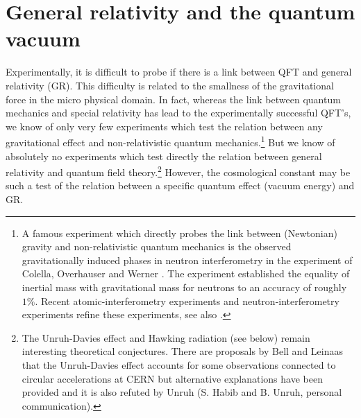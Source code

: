 \documentclass[12pt]{article}
\def\s{\section}
\begin{document}
\s{General relativity and the quantum vacuum}


Experimentally, it is difficult to probe if there is a link
between QFT and general relativity (GR). This difficulty is
related to the smallness of the gravitational force in the micro
physical domain. In fact, whereas the link between quantum
mechanics and special relativity has lead to the experimentally
successful QFT's, we know of only very few experiments which test
the relation between any gravitational effect and non-relativistic
quantum mechanics.\footnote{A famous experiment which directly
probes the link between (Newtonian) gravity and non-relativistic
quantum mechanics is the observed gravitationally induced phases
in neutron interferometry in the experiment of Colella, Overhauser
and Werner \cite{colella75}. The experiment established the
equality of inertial mass with gravitational mass for neutrons to
an accuracy of roughly $1 \%$. Recent atomic-interferometry
experiments and neutron-interferometry experiments refine these
experiments, see also \cite{adunas00}.} But we know of absolutely
no experiments which test directly the relation between general
relativity and quantum field theory.\footnote{The Unruh-Davies
effect and Hawking radiation (see below) remain interesting theoretical
conjectures. There are proposals by Bell and Leinaas that the
Unruh-Davies effect accounts for some observations connected to
circular accelerations at CERN \cite{bell87} but alternative
explanations have been provided and it is also refuted by Unruh
(S. Habib and B. Unruh, personal communication).} However, the
cosmological constant may be such a test of the relation between a
specific quantum effect (vacuum energy) and GR.
\end{document}
